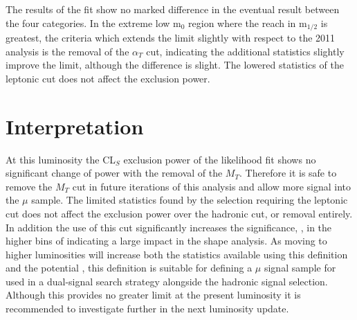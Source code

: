 The results of the fit show no marked difference in the eventual result between the four categories. In the extreme low m$_{0}$ region where the reach in m$_{1/2}$ is greatest, the criteria which extends the limit slightly with respect to the 2011 analysis is the removal of the $\alpha_{T}$ cut, indicating the additional statistics slightly improve the limit, although the difference is slight. The lowered statistics of the leptonic \altl cut does not affect the exclusion power. 

\section{Interpretation}

At this luminosity the CL$_{S}$ exclusion power of the likelihood fit shows no significant change of power with the removal of the $M_{T}$. Therefore it is safe to remove the $M_{T}$ cut in future iterations of this analysis and allow more signal into the $\mu$ sample.  The limited statistics found by the selection requiring the leptonic \alt cut does not affect the exclusion power over the hadronic cut, or removal entirely. In addition the use of this cut significantly increases the significance, \srb, in the higher bins of \HT indicating a large impact in the shape analysis. As moving to higher luminosities will increase both the statistics available using this definition and the potential \srb, this definition is suitable for defining a $\mu$ signal sample for used in a dual-signal search strategy alongside the hadronic signal selection. Although this provides no greater limit at the present luminosity it is recommended to investigate further in the next luminosity update.


